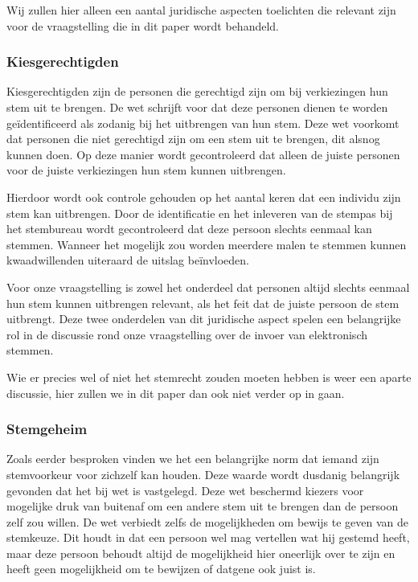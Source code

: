 \documentclass[a4paper]{article}
\begin{document}
Wij zullen hier alleen een aantal juridische aspecten toelichten die relevant zijn voor de vraagstelling die in dit paper wordt behandeld.

\subsubsection{Kiesgerechtigden}
Kiesgerechtigden zijn de personen die gerechtigd zijn om bij verkiezingen hun stem uit te brengen.
De wet schrijft voor dat deze personen dienen te worden geïdentificeerd als zodanig bij het uitbrengen van hun stem.
Deze wet voorkomt dat personen die niet gerechtigd zijn om een stem uit te brengen, dit alsnog kunnen doen.
Op deze manier wordt gecontroleerd dat alleen de juiste personen voor de juiste verkiezingen hun stem kunnen uitbrengen.

Hierdoor wordt ook controle gehouden op het aantal keren dat een individu zijn stem kan uitbrengen.
Door de identificatie en het inleveren van de stempas bij het stembureau wordt gecontroleerd dat deze persoon slechts eenmaal kan stemmen.
Wanneer het mogelijk zou worden meerdere malen te stemmen kunnen kwaadwillenden uiteraard de uitslag beïnvloeden.

Voor onze vraagstelling is zowel het onderdeel dat personen altijd slechts eenmaal hun stem kunnen uitbrengen relevant, als het feit dat de juiste persoon de stem uitbrengt. 
Deze twee onderdelen van dit juridische aspect spelen een belangrijke rol in de discussie rond onze vraagstelling over de invoer van elektronisch stemmen.

Wie er precies wel of niet het stemrecht zouden moeten hebben is weer een aparte discussie, hier zullen we in dit paper dan ook niet verder op in gaan.

\subsubsection{Stemgeheim}
Zoals eerder besproken vinden we het een belangrijke norm dat iemand zijn stemvoorkeur voor zichzelf kan houden.
Deze waarde wordt dusdanig belangrijk gevonden dat het bij wet is vastgelegd.
Deze wet beschermd kiezers voor mogelijke druk van buitenaf om een andere stem uit te brengen dan de persoon zelf zou willen.
De wet verbiedt zelfs de mogelijkheden om bewijs te geven van de stemkeuze.
Dit houdt in dat een persoon wel mag vertellen wat hij gestemd heeft, maar deze persoon behoudt altijd de mogelijkheid hier oneerlijk over te zijn en heeft geen mogelijkheid om te bewijzen of datgene ook juist is.
\end{document}
